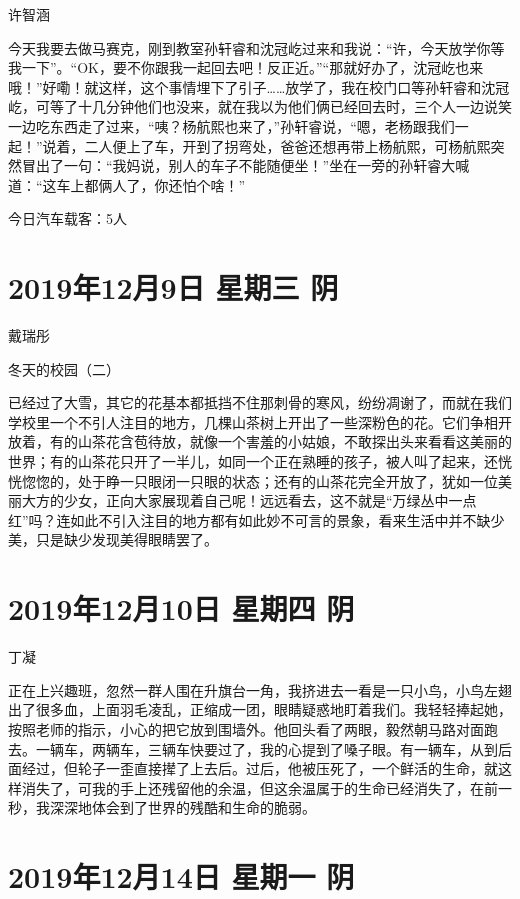 许智涵

今天我要去做马赛克，刚到教室孙轩睿和沈冠屹过来和我说：``许，今天放学你等我一下''。``OK，要不你跟我一起回去吧！反正近。''``那就好办了，沈冠屹也来哦！''好嘞！就这样，这个事情埋下了引子\ldots\ldots 放学了，我在校门口等孙轩睿和沈冠屹，可等了十几分钟他们也没来，就在我以为他们俩已经回去时，三个人一边说笑一边吃东西走了过来，``咦？杨航熙也来了，''孙轩睿说，``嗯，老杨跟我们一起！''说着，二人便上了车，开到了拐弯处，爸爸还想再带上杨航熙，可杨航熙突然冒出了一句：``我妈说，别人的车子不能随便坐！''坐在一旁的孙轩睿大喊道：``这车上都俩人了，你还怕个啥！''

今日汽车载客：5人

\section{2019年12月9日 星期三 阴}

戴瑞彤

冬天的校园（二）

已经过了大雪，其它的花基本都抵挡不住那刺骨的寒风，纷纷凋谢了，而就在我们学校里一个不引人注目的地方，几棵山茶树上开出了一些深粉色的花。它们争相开放着，有的山茶花含苞待放，就像一个害羞的小姑娘，不敢探出头来看看这美丽的世界；有的山茶花只开了一半儿，如同一个正在熟睡的孩子，被人叫了起来，还恍恍惚惚的，处于睁一只眼闭一只眼的状态；还有的山茶花完全开放了，犹如一位美丽大方的少女，正向大家展现着自己呢！远远看去，这不就是``万绿丛中一点红''吗？连如此不引入注目的地方都有如此妙不可言的景象，看来生活中并不缺少美，只是缺少发现美得眼睛罢了。

\section{2019年12月10日 星期四 阴}

丁凝

正在上兴趣班，忽然一群人围在升旗台一角，我挤进去一看是一只小鸟，小鸟左翅出了很多血，上面羽毛凌乱，正缩成一团，眼睛疑惑地盯着我们。我轻轻捧起她，按照老师的指示，小心的把它放到围墙外。他回头看了两眼，毅然朝马路对面跑去。一辆车，两辆车，三辆车快要过了，我的心提到了嗓子眼。有一辆车，从到后面经过，但轮子一歪直接撵了上去后。过后，他被压死了，一个鲜活的生命，就这样消失了，可我的手上还残留他的余温，但这余温属于的生命已经消失了，在前一秒，我深深地体会到了世界的残酷和生命的脆弱。

\section{2019年12月14日 星期一 阴}

